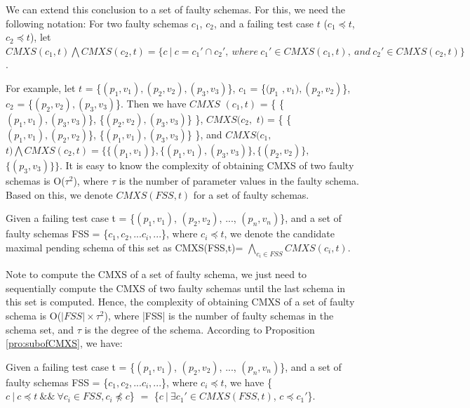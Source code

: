 \documentclass{sig-alternate-05-2015}
\begin{document}
{%


We can extend this conclusion to a set of faulty schemas. For this, we need the following notation: For two faulty schemas $c_{1}$, $c_{2}$, and a failing test case $t$ ($c_{1} \preceq t$, $c_{2} \preceq t$), let $CMXS(c_{1}, t) \bigwedge CMXS(c_{2}, t)  = \{ c\ |\ c = c_{1}' \cap c_{2}',\ where\ c_{1}' \in CMXS(c_{1}, t),\ and\ c_{2}' \in CMXS(c_{2}, t) \}$.

For example, let $t$ = \{$(p_{1},v_{1}), (p_{2}, v_{2}), (p_{3}, v_{3})$\}, $c_{1}$ = \{$(p_{1}$ $, v_{1}), (p_{2}, v_{2})$\}, $c_{2}$ = \{$(p_{2}, v_{2}), (p_{3}, v_{3})$\}. Then we have $CMXS$ $(c_{1}, t)$ = \{ \{$(p_{1}, v_{1}), (p_{3}, v_{3})$\}, \{$(p_{2}, v_{2}), (p_{3}, v_{3})$\} \}, $CMXS(c_{2},$ $ t)$ = \{ \{$(p_{1}, v_{1}), (p_{2}, v_{2})$\}, \{$(p_{1}, v_{1}), (p_{3}, v_{3})$\} \}, and  $CMXS(c_{1},$ $ t) \bigwedge CMXS(c_{2}, t) = \{ \{(p_{1}, v_{1})\}, \{(p_{1}, v_{1}), (p_{3}, v_{3})\}, \{(p_{2}, v_{2})\}, $ $\{(p_{3}, v_{3})\} \} $. It is easy to know the complexity of obtaining CMXS of two faulty schemas is O($\tau^{2}$), where $\tau$ is the number of parameter values in the faulty schema. Based on this, we denote $CMXS(FSS,t)$ for a set of faulty schemas.

\begin{definition}
Given a failing test case t = \{$(p_{1}, v_{1})$, $(p_{2}, v_{2})$, ..., $(p_{n}, v_{n})$\}, and a set of faulty schemas FSS = \{$c_{1} , c_{2}, ... c_{i}, ...$\}, where $ c_{i} \preceq t$,  we denote the candidate maximal pending schema of this set as CMXS(FSS,t)= $\bigwedge_{c_{i}\in FSS} CMXS(c_{i}, t)$.
\end{definition}

Note to compute the CMXS of a set of faulty schema, we just need to sequentially compute the CMXS of two faulty schemas until the last schema in this set is computed. Hence, the complexity of obtaining CMXS of a set of faulty schema is O($|FSS| \times \tau^{2}$), where |FSS| is the number of faulty schemas in the schema set, and $\tau$ is the degree of the schema. According to Proposition \ref{pro:subofCMXS}, we have:

\begin{proposition}\label{pro:subofCMXSfor2}
Given a failing test case t = \{$(p_{1}, v_{1})$, $(p_{2}, v_{2})$, ..., $(p_{n}, v_{n})$\}, and a set of faulty schemas FSS = \{$c_{1} , c_{2}, ... c_{i}, ...$\}, where $ c_{i} \preceq t$,  we have \{$c\ |\ c \preceq t\ \&\&\ \forall c_{i} \in FSS, c_{i} \npreceq c $\} $=$  \{$ c\ |\ \exists c_{1}' \in CMXS(FSS, t)$, $c \preceq c_{1}'$\}.
\end{proposition}

}
\end{document}
